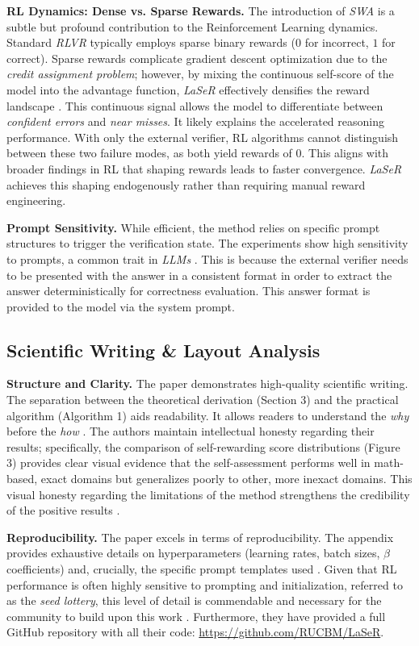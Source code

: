 \documentclass[a4paper,oneside,10pt,ngerman,english]{scrartcl}
\begin{document}
\textbf{RL Dynamics: Dense vs. Sparse Rewards.} The introduction of \textit{SWA} is a subtle but profound contribution to the Reinforcement Learning dynamics. Standard \textit{RLVR} typically employs sparse binary rewards ($0$ for incorrect, $1$ for correct). Sparse rewards complicate gradient descent optimization due to the \textit{credit assignment problem}; however, by mixing the continuous self-score of the model into the advantage function, \textit{LaSeR} effectively densifies the reward landscape \citep{laser}. This continuous signal allows the model to differentiate between \textit{confident errors} and \textit{near misses}. It likely explains the accelerated reasoning performance. With only the external verifier, RL algorithms cannot distinguish between these two failure modes, as both yield rewards of $0$. This aligns with broader findings in RL that shaping rewards leads to faster convergence. \textit{LaSeR} achieves this shaping endogenously rather than requiring manual reward engineering.

\textbf{Prompt Sensitivity.} While efficient, the method relies on specific prompt structures to trigger the verification state. The experiments show high sensitivity to prompts, a common trait in \textit{LLMs} \citep{laser}. This is because the external verifier needs to be presented with the answer in a consistent format in order to extract the answer deterministically for correctness evaluation. This answer format is provided to the model via the system prompt.

\subsection{Scientific Writing \& Layout Analysis}
\textbf{Structure and Clarity.} The paper demonstrates high-quality scientific writing. The separation between the theoretical derivation (Section 3) and the practical algorithm (Algorithm 1) aids readability. It allows readers to understand the \textit{why} before the \textit{how} \citep{laser}. The authors maintain intellectual honesty regarding their results; specifically, the comparison of self-rewarding score distributions (Figure 3) provides clear visual evidence that the self-assessment performs well in math-based, exact domains but generalizes poorly to other, more inexact domains. This visual honesty regarding the limitations of the method strengthens the credibility of the positive results \citep{laser}.

\textbf{Reproducibility.} The paper excels in terms of reproducibility. The appendix provides exhaustive details on hyperparameters (learning rates, batch sizes, $\beta$ coefficients) and, crucially, the specific prompt templates used \citep{laser}. Given that RL performance is often highly sensitive to prompting and initialization, referred to as the \textit{seed lottery}, this level of detail is commendable and necessary for the community to build upon this work \citep{laser}. Furthermore, they have provided a full GitHub repository with all their code: \url{https://github.com/RUCBM/LaSeR}.
\end{document}
